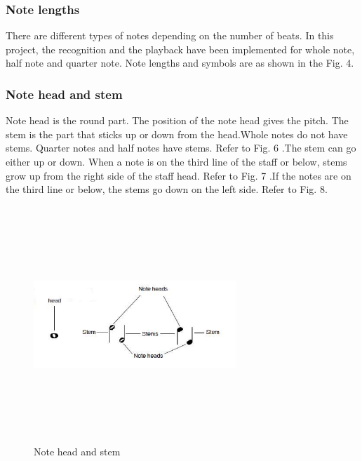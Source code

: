 \documentclass[journal]{IEEEtran}
\begin{document}
\subsubsection{Note lengths}
There are different types of notes depending on the number of beats. In this
project, the recognition and the playback have been implemented for whole note, half note
and quarter note. Note lengths and symbols are as shown in the Fig. 4.

\subsubsection{Note head and stem}
Note head is the round part. The position of the note head gives the
pitch. The stem is the part that sticks up or down from the head.Whole notes do not have
stems. Quarter notes and half notes have stems. Refer to Fig. 6 .The stem can go either up or down. When a note is on the third line of the staff or below, stems grow up from the right side of the staff head. Refer to Fig. 7 .If the notes are on the third line or below, the stems go down on the left side. Refer to Fig. 8.

\begin{figure}
\includegraphics[width=3in,height=3.5in,clip,keepaspectratio]{resources/images/note_head_stem}
\centering
\caption{Note head and stem}
\end{figure}
\end{document}
